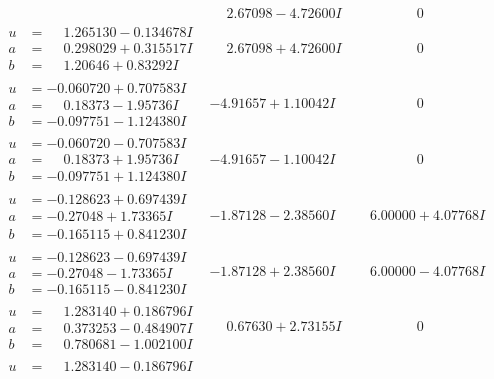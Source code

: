 \documentclass[1p]{elsarticle_modified}
\theoremstyle{definition}
\begin{document}
$$\begin{array}{c|c|c}
 & \phantom{-}2.67098 - 4.72600 I & \phantom{-0.000000 } 0 \\ \hline\begin{aligned}
u &= \phantom{-}1.265130 - 0.134678 I \\
a &= \phantom{-}0.298029 + 0.315517 I \\
b &= \phantom{-}1.20646 + 0.83292 I\end{aligned}
 & \phantom{-}2.67098 + 4.72600 I & \phantom{-0.000000 } 0 \\ \hline\begin{aligned}
u &= -0.060720 + 0.707583 I \\
a &= \phantom{-}0.18373 - 1.95736 I \\
b &= -0.097751 - 1.124380 I\end{aligned}
 & -4.91657 + 1.10042 I & \phantom{-0.000000 } 0 \\ \hline\begin{aligned}
u &= -0.060720 - 0.707583 I \\
a &= \phantom{-}0.18373 + 1.95736 I \\
b &= -0.097751 + 1.124380 I\end{aligned}
 & -4.91657 - 1.10042 I & \phantom{-0.000000 } 0 \\ \hline\begin{aligned}
u &= -0.128623 + 0.697439 I \\
a &= -0.27048 + 1.73365 I \\
b &= -0.165115 + 0.841230 I\end{aligned}
 & -1.87128 - 2.38560 I & \phantom{-}6.00000 + 4.07768 I \\ \hline\begin{aligned}
u &= -0.128623 - 0.697439 I \\
a &= -0.27048 - 1.73365 I \\
b &= -0.165115 - 0.841230 I\end{aligned}
 & -1.87128 + 2.38560 I & \phantom{-}6.00000 - 4.07768 I \\ \hline\begin{aligned}
u &= \phantom{-}1.283140 + 0.186796 I \\
a &= \phantom{-}0.373253 - 0.484907 I \\
b &= \phantom{-}0.780681 - 1.002100 I\end{aligned}
 & \phantom{-}0.67630 + 2.73155 I & \phantom{-0.000000 } 0 \\ \hline\begin{aligned}
u &= \phantom{-}1.283140 - 0.186796 I \\

\end{aligned}
\end{array}$$
\end{document}
